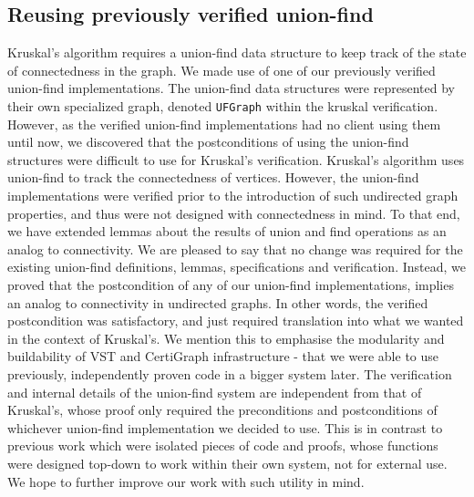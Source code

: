 \subsection{Reusing previously verified union-find} %
Kruskal's algorithm requires a union-find data structure to keep track of the state of connectedness in the graph. We made use of one of our previously verified union-find implementations. The union-find data structures were represented by their own specialized graph, denoted \texttt{UFGraph} within the kruskal verification.
\newline\newline
However, as the verified union-find implementations had no client using them until now, we discovered that the postconditions of using the union-find structures were difficult to use for Kruskal's verification. Kruskal's algorithm uses union-find to track the connectedness of vertices. However, the union-find implementations were verified prior to the introduction of such undirected graph properties, and thus were not designed with connectedness in mind. To that end, we have extended lemmas about the results of union and find operations as an analog to connectivity.
\newline\newline
We are pleased to say that no change was required for the existing union-find definitions, lemmas, specifications and verification. Instead, we proved that the postcondition of any of our union-find implementations, implies an analog to connectivity in undirected graphs. In other words, the verified postcondition was satisfactory, and just required translation into what we wanted in the context of Kruskal's.
\newline\newline
We mention this to emphasise the modularity and buildability of VST and CertiGraph infrastructure - that we were able to use previously, independently proven code in a bigger system later. The verification and internal details of the union-find system are independent from that of Kruskal's, whose proof only required the preconditions and postconditions of whichever union-find implementation we decided to use. This is in contrast to previous work which were isolated pieces of code and proofs, whose functions were designed top-down to work within their own system, not for external use. We hope to further improve our work with such utility in mind.
